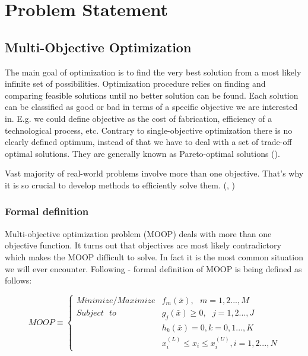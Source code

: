 \chapter{Problem Statement}
\label{cha:multiObjectiveOptimization}




\section{Multi-Objective Optimization}
\label{sec:multi}

The main goal of optimization is to find the very best solution from a most likely infinite set of possibilities.
Optimization procedure relies on finding and comparing feasible solutions until no better solution can be found.
Each solution can be classified as good or bad in terms of a specific objective we are interested in.
E.g. we could define objective as the cost of fabrication, efficiency of a technological process, etc.
Contrary to single-objective optimization there is no clearly defined optimum, instead of that we have to deal with a set of trade-off optimal solutions.
They are generally known as Pareto-optimal solutions (\cite{Phd}).

Vast majority of real-world problems involve more than one objective.
That's why it is so crucial to develop methods to efficiently solve them.
(\cite{Phd}, \cite{Deb:2001:MOU:559152})

\subsection{Formal definition}

Multi-objective optimization problem (MOOP) deals with more than one objective function.
It turns out that objectives are most likely contradictory which makes the MOOP difficult to solve.
In fact it is the most common situation we will ever encounter. 
Following \cite{Deb:2001:MOU:559152} - formal definition of MOOP is being defined as follows:

\begin{equation} 
MOOP \equiv
 \begin{cases}
     Minimize/Maximize  & f_{m}(\bar{x}), \text{ } m = 1,2...,M \\
     Subject \text{ } to  &  g_{j}(\bar{x}) \geq 0, \text{ } j = 1,2..., J  \\ 
			  &  h_{k}(\bar{x}) = 0, k = 0,1...,K \\
			  &  x_{i}^{(L)} \leq x_{i} \leq x_{i}^{(U)}, i = 1,2...,N
      
\end{cases}  
\end{equation}

